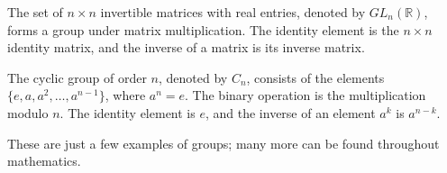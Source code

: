 \begin{example}
  The set of $n \times n$ invertible matrices with real entries, denoted by $GL_n(\mathbb{R})$, forms a group under matrix multiplication. The identity element is the $n \times n$ identity matrix, and the inverse of a matrix is its inverse matrix.
\end{example}

\begin{example}
  The cyclic group of order $n$, denoted by $C_n$, consists of the elements $\{e, a, a^2, \dots, a^{n-1}\}$, where $a^n = e$. The binary operation is the multiplication modulo $n$. The identity element is $e$, and the inverse of an element $a^k$ is $a^{n-k}$.
\end{example}

These are just a few examples of groups; many more can be found throughout mathematics.

